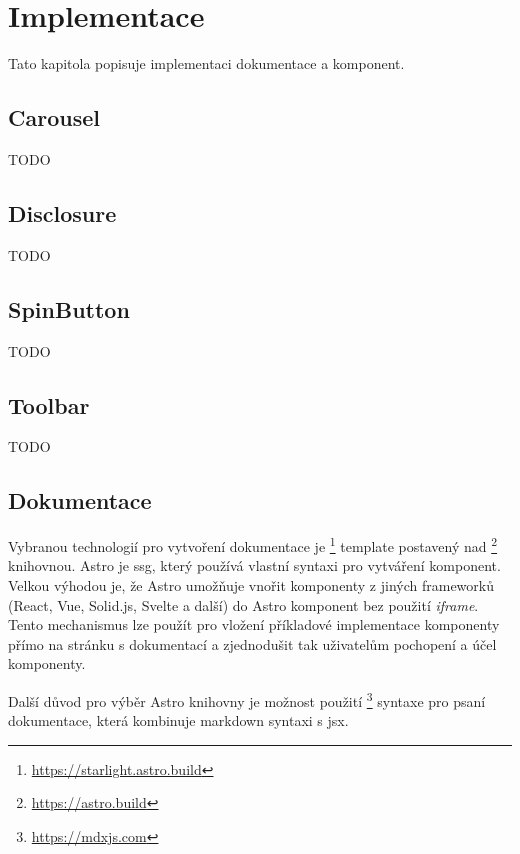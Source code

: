 \chapter{Implementace}

Tato kapitola popisuje implementaci dokumentace a komponent.

\section{Carousel}

TODO

\section{Disclosure}

TODO

\section{SpinButton}

TODO

\section{Toolbar}

TODO

\section{Dokumentace}

Vybranou technologií pro vytvoření dokumentace je \footnote{\url{https://starlight.astro.build}} template postavený nad \footnote{\url{https://astro.build}} knihovnou.
Astro je \gls{ssg}, který používá vlastní syntaxi pro vytváření komponent.
Velkou výhodou je, že Astro umožňuje vnořit komponenty z jiných frameworků (React, Vue, Solid.js, Svelte a další) do Astro komponent bez použití \textit{iframe}.
Tento mechanismus lze použít pro vložení příkladové implementace komponenty přímo na stránku s dokumentací a zjednodušit tak uživatelům pochopení a účel komponenty.

Další důvod pro výběr Astro knihovny je možnost použití \footnote{\url{https://mdxjs.com}} syntaxe pro psaní dokumentace, která kombinuje markdown syntaxi s \gls{jsx}.

